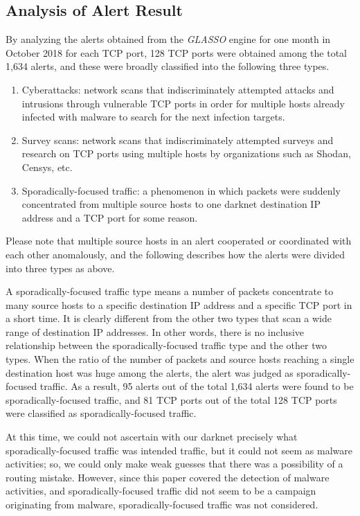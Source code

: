 \documentclass[conference]{IEEEtran}
\begin{document}
\subsection{Analysis of Alert Result}
\label{Analysis}
By analyzing the alerts obtained from the \textit{GLASSO} engine for one month in October 2018 for each TCP port, 128 TCP ports were obtained among the total 1,634 alerts, and these were broadly classified into the following three types.
\begin{enumerate}
  \item Cyberattacks: network scans that indiscriminately attempted attacks and intrusions through vulnerable TCP ports in order for multiple hosts already infected with malware to search for the next infection targets.
  \item Survey scans: network scans that indiscriminately attempted surveys and research on TCP ports using multiple hosts by organizations such as Shodan, Censys, etc.
  \item Sporadically-focused traffic: a phenomenon in which packets were suddenly concentrated from multiple source hosts to one darknet destination IP address and a TCP port for some reason.
\end{enumerate}
Please note that multiple source hosts in an alert cooperated or coordinated with each other anomalously, and the following describes how the alerts were divided into three types as above.


A sporadically-focused traffic type means a number of packets concentrate to many source hosts to a specific destination IP address and a specific TCP port in a short time.
It is clearly different from the other two types that scan a wide range of destination IP addresses.
In other words, there is no inclusive relationship between the sporadically-focused traffic type and the other two types.
When the ratio of the number of packets and source hosts reaching a single destination host was huge among the alerts, the alert was judged as sporadically-focused traffic.
As a result, 95 alerts out of the total 1,634 alerts were found to be sporadically-focused traffic, and 81 TCP ports out of the total 128 TCP ports were classified as sporadically-focused traffic.

At this time, we could not ascertain with our darknet precisely what sporadically-focused traffic was intended traffic, but it could not seem as malware activities; so, we could only make weak guesses that there was a possibility of a routing mistake.
However, since this paper covered the detection of malware activities, and sporadically-focused traffic did not seem to be a campaign originating from malware, sporadically-focused traffic was not considered.
\end{document}
